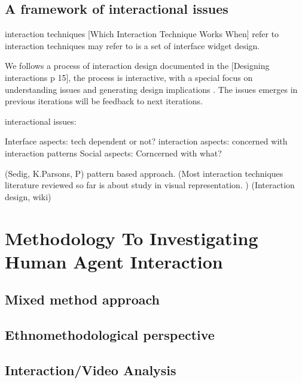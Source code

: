 \section{A framework of interactional issues}\label{sec:interactional}
interaction techniques 
[Which Interaction Technique Works When] refer to interaction techniques may refer to is a set of interface widget design.


We follows a process of interaction design documented in the [Designing interactions p 15], the process is interactive, with a special focus on understanding issues and generating design implications . The issues emerges in previous iterations will be feedback to next iterations. 

interactional issues: 

Interface aspects: tech dependent or not?
interaction aspects: concerned with interaction patterns 
Social aspects: Corncerned with what? 

(Sedig, K.Parsons, P) pattern based approach.
(Most interaction techniques literature reviewed so far is about study in visual representation. )
(Interaction design, wiki)




\chapter{ Methodology To Investigating Human Agent Interaction}

\section{ Mixed method approach }

\section{ Ethnomethodological perspective }

\section{ Interaction/Video Analysis}




